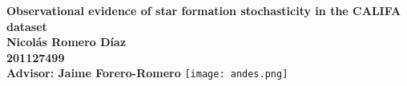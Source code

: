 \documentclass[letterpaper, 11pt]{report}
\begin{document}
%

\begin{titlepage}
    \centering
    \vfill
    {\bfseries\huge
        Observational evidence of star formation stochasticity in the CALIFA dataset\\
        \vskip2cm
        \Large
        Nicol\'as Romero D\'iaz\\
        201127499\\
        Advisor: Jaime Forero-Romero
    }
    \vfill
    \vfill
    \vfill
    \texttt{[image: andes.png]} %

\end{titlepage}

%

\tableofcontents





  









%




%

%
\end{document}
